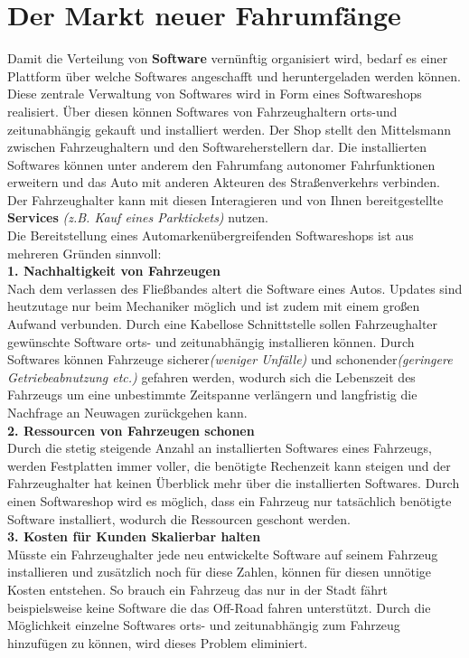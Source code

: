 \section{Der Markt neuer Fahrumfänge}\label{wsk}
Damit die Verteilung von \textbf{Software} vernünftig organisiert wird, bedarf es einer Plattform über welche Softwares angeschafft und heruntergeladen werden können. Diese zentrale Verwaltung von Softwares wird in Form eines Softwareshops realisiert. Über diesen können Softwares von Fahrzeughaltern orts-und zeitunabhängig gekauft und installiert werden. Der Shop stellt den Mittelsmann zwischen Fahrzeughaltern und den Softwareherstellern dar. Die installierten Softwares können unter anderem den Fahrumfang autonomer Fahrfunktionen erweitern und das Auto mit anderen Akteuren des Straßenverkehrs verbinden. Der Fahrzeughalter kann mit diesen Interagieren und von Ihnen bereitgestellte \textbf{Services} \textit{(z.B. Kauf eines Parktickets)} nutzen.\\
Die Bereitstellung eines Automarkenübergreifenden Softwareshops ist aus mehreren Gründen sinnvoll:\\

\textbf{1. Nachhaltigkeit von Fahrzeugen}\\
Nach dem verlassen des Fließbandes altert die Software eines Autos. Updates sind heutzutage nur beim Mechaniker möglich und ist zudem mit einem großen Aufwand verbunden. Durch eine Kabellose Schnittstelle sollen Fahrzeughalter gewünschte Software orts- und zeitunabhängig installieren können. Durch Softwares können Fahrzeuge sicherer\textit{(weniger Unfälle)} und schonender\textit{(geringere Getriebeabnutzung etc.)} gefahren werden, wodurch sich die Lebenszeit des Fahrzeugs um eine unbestimmte Zeitspanne verlängern und langfristig die Nachfrage an Neuwagen zurückgehen kann.\\


\textbf{2. Ressourcen von Fahrzeugen schonen}\\
Durch die stetig steigende Anzahl an installierten Softwares eines Fahrzeugs, werden Festplatten immer voller, die benötigte Rechenzeit kann steigen und der Fahrzeughalter hat keinen Überblick mehr über die installierten Softwares. Durch einen Softwareshop wird es möglich, dass ein Fahrzeug nur tatsächlich benötigte Software installiert, wodurch die Ressourcen geschont werden.\\

\textbf{3. Kosten für Kunden Skalierbar halten}\\
Müsste ein Fahrzeughalter jede neu entwickelte Software auf seinem Fahrzeug installieren und zusätzlich noch für diese Zahlen, können für diesen unnötige Kosten entstehen. So brauch ein Fahrzeug das nur in der Stadt fährt beispielsweise keine Software die das Off-Road fahren unterstützt. Durch die Möglichkeit einzelne Softwares orts- und zeitunabhängig zum Fahrzeug hinzufügen zu können, wird dieses Problem eliminiert.\\

